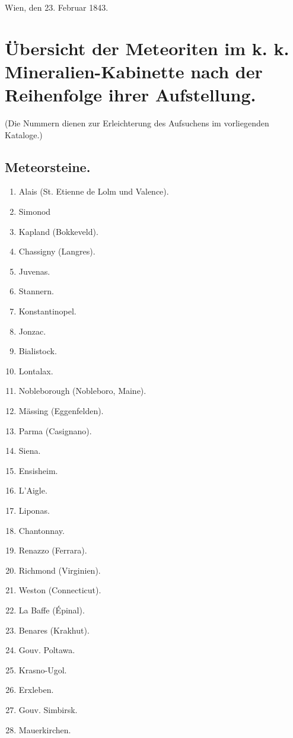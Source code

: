\documentclass[a4paper, 11pt, oneside, polutonikogreek, german]{article}
\begin{document}
Wien, den 23. Februar 1843.
\clearpage
\section{Übersicht der Meteoriten im k. k. Mineralien-Kabinette nach der Reihenfolge ihrer Aufstellung.}
\begin{center}
\small
(Die Nummern dienen zur Erleichterung des Aufsuchens im vorliegenden Kataloge.)
\end{center}
\subsection{Meteorsteine.}
\begin{enumerate}
    \small
    \item Alais (St. Etienne de Lolm und Valence).
    \item Simonod
    \item Kapland (Bokkeveld).
    \item Chassigny (Langres).
    \item Juvenas.
    \item Stannern.
    \item Konstantinopel.
    \item Jonzac.
    \item Bialistock.
    \item Lontalax.
    \item Nobleborough (Nobleboro, Maine).
    \item Mässing (Eggenfelden).
    \item Parma (Casignano).
    \item Siena.
    \item Ensisheim.
    \item L'Aigle.
    \item Liponas.
    \item Chantonnay.
    \item Renazzo (Ferrara).
    \item Richmond (Virginien).
    \item Weston (Connecticut).
    \item La Baffe (Épinal).
    \item Benares (Krakhut).
    \item Gouv. Poltawa.
    \item Krasno-Ugol.
    \item Erxleben.
    \item Gouv. Simbirsk.
    \item Mauerkirchen.

\end{enumerate}
\end{document}
